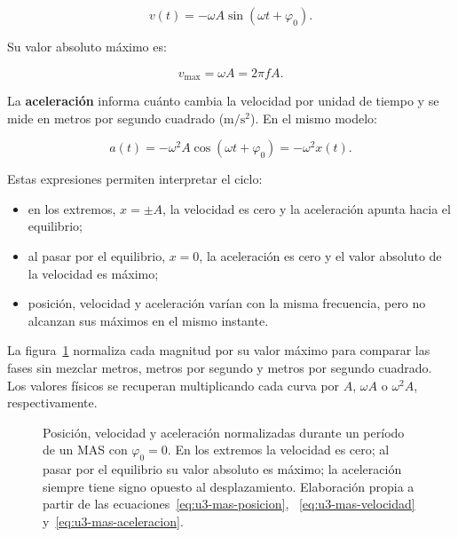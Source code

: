 \begin{equation}
    v(t)=-\omega A\sin\left(\omega t+\varphi_0\right).
    \label{eq:u3-mas-velocidad}
\end{equation}

Su valor absoluto máximo es:

\begin{equation}
    v_{\max}=\omega A=2\pi fA.
    \label{eq:u3-velocidad-maxima}
\end{equation}

La \textbf{aceleración} informa cuánto cambia la velocidad por unidad de
tiempo y se mide en metros por segundo cuadrado
(\(\text{m}/\text{s}^{2}\)). En el mismo modelo:

\begin{equation}
    a(t)=-\omega^{2}A\cos\left(\omega t+\varphi_0\right)
        =-\omega^{2}x(t).
    \label{eq:u3-mas-aceleracion}
\end{equation}

Estas expresiones permiten interpretar el ciclo:

\begin{itemize}
    \item en los extremos, \(x=\pm A\), la velocidad es cero y la aceleración
    apunta hacia el equilibrio;
    \item al pasar por el equilibrio, \(x=0\), la aceleración es cero y el
    valor absoluto de la velocidad es máximo;
    \item posición, velocidad y aceleración varían con la misma frecuencia,
    pero no alcanzan sus máximos en el mismo instante.
\end{itemize}

La figura~\ref{fig:u3-mas-cinematica} normaliza cada magnitud por su valor
máximo para comparar las fases sin mezclar metros, metros por segundo y metros
por segundo cuadrado. Los valores físicos se recuperan multiplicando cada
curva por \(A\), \(\omega A\) o \(\omega^{2}A\), respectivamente.

\begin{figure}[htbp]
    \centering
    
    \caption{Posición, velocidad y aceleración normalizadas durante un período
    de un MAS con \(\varphi_0=0\). En los extremos la velocidad es cero; al
    pasar por el equilibrio su valor absoluto es máximo; la aceleración
    siempre tiene signo opuesto al desplazamiento. Elaboración propia a partir
    de las ecuaciones~\eqref{eq:u3-mas-posicion},~%
    \eqref{eq:u3-mas-velocidad} y~\eqref{eq:u3-mas-aceleracion}.}
    \label{fig:u3-mas-cinematica}
\end{figure}

